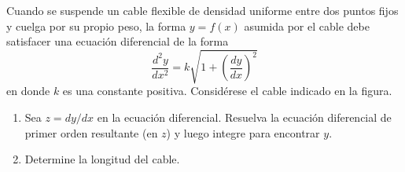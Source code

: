 \item Cuando se suspende un cable flexible de densidad uniforme entre dos puntos fijos y cuelga por su propio peso, la forma $y = f(x)$ asumida por el cable debe satisfacer una ecuación diferencial de la forma
    \[ \frac{d^2y}{dx^2} = k \sqrt{1 + \left(\frac{dy}{dx}\right)^2} \]
    en donde $k$ es una constante positiva. Considérese el cable indicado en la figura.
    \begin{enumerate}
        \item[(a)] Sea $z = dy/dx$ en la ecuación diferencial. Resuelva la ecuación diferencial de primer orden resultante (en $z$) y luego integre para encontrar $y$.
        \item[(b)] Determine la longitud del cable.
    \end{enumerate}
    
    \begin{center}
    \end{center}
